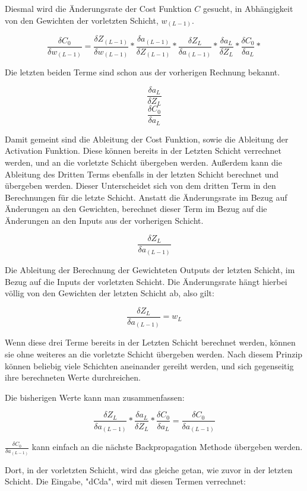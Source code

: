 \documentclass[12pt]{article}
\begin{document}
Diesmal wird die Änderungsrate der Cost Funktion $C$ gesucht, in Abhängigkeit von den Gewichten der vorletzten Schicht, $w_{(L-1)}$.

$$\frac{\delta C_0}{\delta w_{(L-1)}}=
\frac{\delta Z_{(L-1)}}{\delta w_{(L-1)}}*
\frac{\delta a_{(L-1)}}{\delta Z_{(L-1)}}*
\frac{\delta Z_L}{\delta a_{(L-1)}}*
\frac{\delta a_L}{\delta Z_L}*
\frac{\delta C_0}{\delta a_L}*
$$

Die letzten beiden Terme sind schon aus der vorherigen Rechnung bekannt.

$$\frac{\delta a_L}{\delta Z_L}$$
$$\frac{\delta C_0}{\delta a_L}$$

Damit gemeint sind die Ableitung der Cost Funktion, sowie die Ableitung der Activation Funktion. Diese können bereits in der Letzten Schicht verrechnet werden, und an die vorletzte Schicht übergeben werden. Außerdem kann die Ableitung des Dritten Terms ebenfalls in der letzten Schicht berechnet und übergeben werden. Dieser Unterscheidet sich von dem dritten Term in den Berechnungen für die letzte Schicht. Anstatt die Änderungsrate im Bezug auf Änderungen an den Gewichten, berechnet dieser Term im Bezug auf die Änderungen an den Inputs aus der vorherigen Schicht.

$$\frac{\delta Z_L}{\delta a_{(L-1)}}$$

Die Ableitung der Berechnung der Gewichteten Outputs der letzten Schicht, im Bezug auf die Inputs der vorletzten Schicht. Die Änderungsrate hängt hierbei völlig von den Gewichten der letzten Schicht ab, also gilt:

$$\frac{\delta Z_L}{\delta a_{(L-1)}} = w_L$$

Wenn diese drei Terme bereits in der Letzten Schicht berechnet werden, können sie ohne weiteres an die vorletzte Schicht übergeben werden. Nach diesem Prinzip können beliebig viele Schichten aneinander gereiht werden, und sich gegenseitig ihre berechneten Werte durchreichen. 

Die bisherigen Werte kann man zusammenfassen:

$$
\frac{\delta Z_L}{\delta a_{(L-1)}}*
\frac{\delta a_L}{\delta Z_L}*
\frac{\delta C_0}{\delta a_L}
= \frac{\delta C_0}{\delta a_{(L-1)}}
$$

$\frac{\delta C_0}{\delta a_{(L-1)}}$ kann einfach an die nächste Backpropagation Methode übergeben werden.

Dort, in der vorletzten Schicht, wird das gleiche getan, wie zuvor in der letzten Schicht. Die Eingabe, "dCda", wird mit diesen Termen verrechnet:
\end{document}
